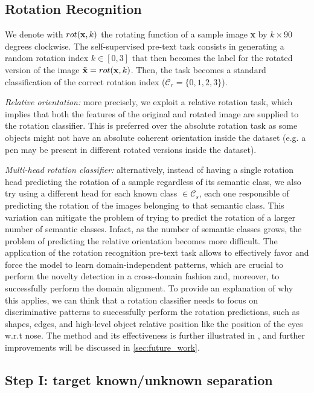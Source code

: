 \documentclass[10pt,twocolumn,letterpaper]{article}
\begin{document}
\subsection{Rotation Recognition}
\label{sec:rotrecognition}

We denote with $rot({\bf x}, k)$ the rotating function of a sample image {\bf x} by $k\times 90$ degrees clockwise.
The self-supervised pre-text task consists in generating a random rotation index $k \in [0, 3]$ that then becomes
the label for the rotated version of the image ${\bf \tilde{x}} = rot({\bf x}, k)$.
Then, the task becomes a standard classification of the correct rotation index ($\mathcal{C}_r = \{0, 1, 2, 3\}$).

{\it Relative orientation:}
more precisely, we exploit a relative rotation task,
which implies that both the features of the original and rotated image are supplied to the rotation classifier.
This is preferred over the absolute rotation task as some objects might not have an absolute coherent orientation
inside the dataset
(e.g. a pen may be present in different rotated versions inside the dataset). 

{\it Multi-head rotation classifier:}
alternatively, 
instead of having a single rotation head predicting the rotation of a sample regardless of its semantic class, 
we also try using a different head for each known class $\in \mathcal{C}_s$, each one responsible of predicting the rotation
of the images belonging to that semantic class.
This variation can mitigate the problem of trying to predict the rotation of a larger number
of semantic classes. Infact, as the number of semantic classes grows,
the problem of predicting the relative orientation becomes more difficult.
The application of the rotation recognition pre-text task allows to effectively favor and force the model to learn
domain-independent patterns, which are crucial to perform the novelty detection in a cross-domain fashion and, moreover,
to successfully perform the domain alignment.
To provide an explanation of why this applies, we can think that a rotation classifier needs to focus on discriminative patterns to
successfully perform the rotation predictions, such as shapes, edges, and high-level object relative position like the position of the eyes
w.r.t nose.
The method and its effectiveness is further illustrated in \cite{OldROS},
and further improvements will be discussed in \ref{sec:future_work}.

\subsection{Step I: target known/unknown separation}
\label{sec:stepone}
\end{document}
